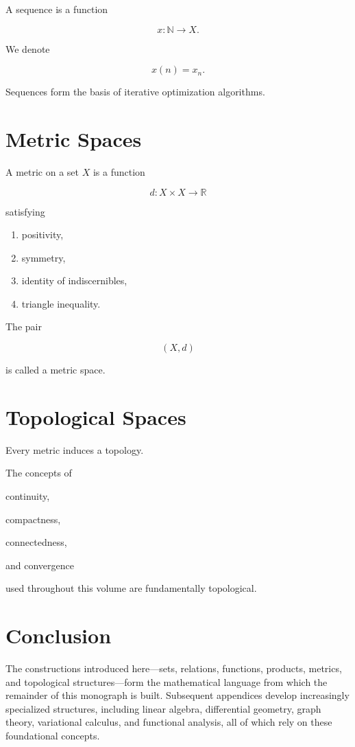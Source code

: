 \documentclass[11pt,fleqn]{book}
\numberwithin{equation}{chapter}
\theoremstyle{plain}
\theoremstyle{definition}
\theoremstyle{remark}
\begin{document}
A sequence is a function

\[
x:\mathbb N\rightarrow X.
\]

We denote

\[
x(n)
=
x_n.
\]

Sequences form the basis of iterative optimization algorithms.


\section{Metric Spaces}

A metric on a set $X$ is a function

\[
d:X\times X\rightarrow\mathbb R
\]

satisfying

\begin{enumerate}
\item positivity,
\item symmetry,
\item identity of indiscernibles,
\item triangle inequality.
\end{enumerate}

The pair

\[
(X,d)
\]

is called a metric space.


\section{Topological Spaces}

Every metric induces a topology.

The concepts of

continuity,

compactness,

connectedness,

and convergence

used throughout this volume are fundamentally topological.


\section{Conclusion}

The constructions introduced here—sets, relations, functions, products,
metrics, and topological structures—form the mathematical language from
which the remainder of this monograph is built. Subsequent appendices
develop increasingly specialized structures, including linear algebra,
differential geometry, graph theory, variational calculus, and
functional analysis, all of which rely on these foundational concepts.
\end{document}
